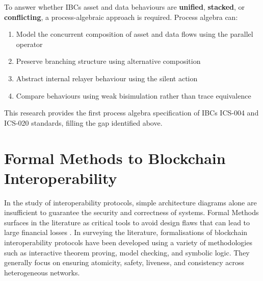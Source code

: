 To answer whether IBC\textquotesingle s asset and data behaviours are
\textbf{unified}, \textbf{stacked}, or \textbf{conflicting}, a
process-algebraic approach is required. Process algebra can:

\begin{enumerate}
\tightlist
\item
  Model the concurrent composition of asset and data flows using the
  parallel operator
\item
  Preserve branching structure using alternative composition
\item
  Abstract internal relayer behaviour using the silent action
\item
  Compare behaviours using weak bisimulation rather than trace
  equivalence
\end{enumerate}

This research provides the first process algebra specification of
IBC\textquotesingle s ICS-004 and ICS-020 standards, filling the gap
identified above.

\section{Formal Methods to Blockchain
Interoperability}\label{formal-methods-to-blockchain-interoperability}

In the study of interoperability protocols, simple architecture diagrams
alone are insufficient to guarantee the security and correctness of
systems. Formal Methods surfaces in the literature as critical tools to
avoid design flaws that can lead to large financial losses
\citep{Wei_2023} \citep{Llambas2024eventb}. In surveying the literature,
formalisations of blockchain interoperability protocols have been
developed using a variety of methodologies such as interactive theorem
proving, model checking, and symbolic logic. They generally focus on
ensuring atomicity, safety, liveness, and consistency across
heterogeneous networks.

